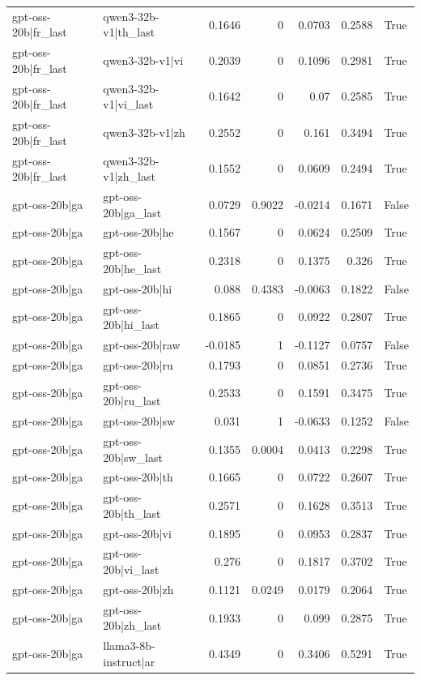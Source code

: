 \begin{table}
\begin{tabular}{l l r r r r l}
gpt-oss-20b|fr_last & qwen3-32b-v1|th_last & 0.1646 & 0 & 0.0703 & 0.2588 & True \\
gpt-oss-20b|fr_last & qwen3-32b-v1|vi & 0.2039 & 0 & 0.1096 & 0.2981 & True \\
gpt-oss-20b|fr_last & qwen3-32b-v1|vi_last & 0.1642 & 0 & 0.07 & 0.2585 & True \\
gpt-oss-20b|fr_last & qwen3-32b-v1|zh & 0.2552 & 0 & 0.161 & 0.3494 & True \\
gpt-oss-20b|fr_last & qwen3-32b-v1|zh_last & 0.1552 & 0 & 0.0609 & 0.2494 & True \\
gpt-oss-20b|ga & gpt-oss-20b|ga_last & 0.0729 & 0.9022 & -0.0214 & 0.1671 & False \\
gpt-oss-20b|ga & gpt-oss-20b|he & 0.1567 & 0 & 0.0624 & 0.2509 & True \\
gpt-oss-20b|ga & gpt-oss-20b|he_last & 0.2318 & 0 & 0.1375 & 0.326 & True \\
gpt-oss-20b|ga & gpt-oss-20b|hi & 0.088 & 0.4383 & -0.0063 & 0.1822 & False \\
gpt-oss-20b|ga & gpt-oss-20b|hi_last & 0.1865 & 0 & 0.0922 & 0.2807 & True \\
gpt-oss-20b|ga & gpt-oss-20b|raw & -0.0185 & 1 & -0.1127 & 0.0757 & False \\
gpt-oss-20b|ga & gpt-oss-20b|ru & 0.1793 & 0 & 0.0851 & 0.2736 & True \\
gpt-oss-20b|ga & gpt-oss-20b|ru_last & 0.2533 & 0 & 0.1591 & 0.3475 & True \\
gpt-oss-20b|ga & gpt-oss-20b|sw & 0.031 & 1 & -0.0633 & 0.1252 & False \\
gpt-oss-20b|ga & gpt-oss-20b|sw_last & 0.1355 & 0.0004 & 0.0413 & 0.2298 & True \\
gpt-oss-20b|ga & gpt-oss-20b|th & 0.1665 & 0 & 0.0722 & 0.2607 & True \\
gpt-oss-20b|ga & gpt-oss-20b|th_last & 0.2571 & 0 & 0.1628 & 0.3513 & True \\
gpt-oss-20b|ga & gpt-oss-20b|vi & 0.1895 & 0 & 0.0953 & 0.2837 & True \\
gpt-oss-20b|ga & gpt-oss-20b|vi_last & 0.276 & 0 & 0.1817 & 0.3702 & True \\
gpt-oss-20b|ga & gpt-oss-20b|zh & 0.1121 & 0.0249 & 0.0179 & 0.2064 & True \\
gpt-oss-20b|ga & gpt-oss-20b|zh_last & 0.1933 & 0 & 0.099 & 0.2875 & True \\
gpt-oss-20b|ga & llama3-8b-instruct|ar & 0.4349 & 0 & 0.3406 & 0.5291 & True \\

\end{tabular}
\end{table}
